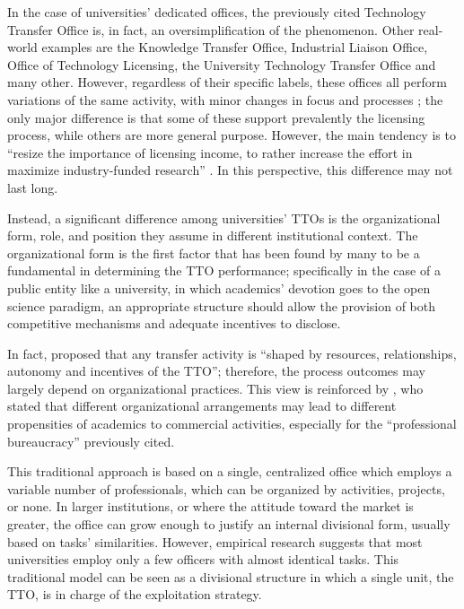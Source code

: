 In the case of universities' dedicated offices, the previously cited Technology Transfer Office is, in fact, an oversimplification of the phenomenon. Other real-world examples are the Knowledge Transfer Office, Industrial Liaison Office, Office of Technology Licensing, the University Technology Transfer Office and many other. However, regardless of their specific labels, these offices all perform variations of the same activity, with minor changes in focus and processes \citep{Brescia2016}; the only major difference is that some of these support prevalently the licensing process, while others are more general purpose. However, the main tendency is to \enquote{resize the importance of licensing income, to rather increase the effort in maximize industry-funded research} \citep{Balderi2010}. In this perspective, this difference may not last long. 

Instead, a significant difference among universities' TTOs is the organizational form, role, and position they assume in different institutional context. The organizational form is the first factor that has been found by many to be a fundamental in determining the TTO performance; specifically in the case of a public entity like a university, in which academics' devotion goes to the open science paradigm, an appropriate structure should allow the provision of both competitive mechanisms and adequate incentives to disclose. 

In fact, \citet{Bercovitz2001} proposed that any transfer activity is \enquote{shaped by resources, relationships, autonomy and incentives of the TTO}; therefore, the process outcomes may largely depend on organizational practices. This view is reinforced by \citet{Debackere2005}, who stated that different organizational arrangements may lead to different propensities of academics to commercial activities, especially for the \enquote{professional bureaucracy} previously cited. 

This traditional approach is based on a single, centralized office which employs a variable number of professionals, which can be organized by activities, projects, or none. In larger institutions, or where the attitude toward the market is greater, the office can grow enough to justify an internal divisional form, usually based on tasks' similarities. However, empirical research suggests that most universities employ only a few officers with almost identical tasks. This traditional model can be seen as a divisional structure in which a single unit, the TTO, is in charge of the exploitation strategy. 

